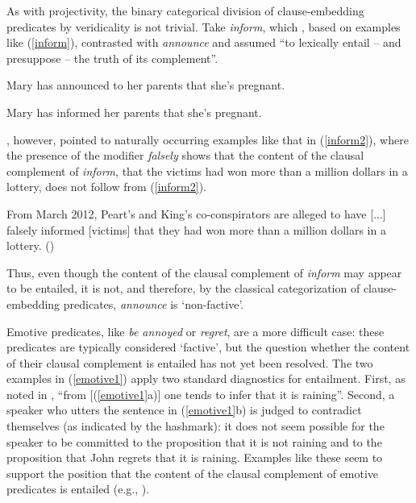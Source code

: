 \documentclass[11pt,fleqn]{article}
\newcommand{\6}{\mbox{$[\hspace*{-.6mm}[$}}
\newcommand{\9}{\mbox{$]\hspace*{-.6mm}]$}}
\begin{document}
As with projectivity, the binary categorical division of clause-embedding predicates by veridicality is not trivial. Take {\em inform}, which \citet[139]{schlenker10}, based on examples like (\ref{inform}), contrasted with {\em announce} and assumed ``to lexically entail -- and presuppose -- the truth of its complement''.

\begin{exe}
\ex\label{inform}

\begin{xlist}

\ex Mary has announced to her parents that she's pregnant.

\ex Mary has informed her parents that she's pregnant.

\end{xlist}
\end{exe}
\citet[76]{anand-hacquard2014}, however, pointed to naturally occurring examples like that in (\ref{inform2}), where the presence of the modifier {\em falsely} shows that the content of the clausal complement of {\em inform}, that the victims had won more than a million dollars in a lottery, does not follow from (\ref{inform2}).

\begin{exe}
\ex\label{inform2} From March 2012, Peart's and King's co-conspirators are alleged to have [...] falsely informed [victims] that they had won more than a million dollars in a lottery. \hfill (\citealt[76]{anand-hacquard2014})
\end{exe}
Thus, even though the content of the clausal complement of {\em inform} may appear to be entailed, it is not, and therefore, by the classical categorization of clause-embedding predicates, {\em announce} is `non-factive'.

Emotive predicates, like  {\em be annoyed} or {\em regret}, are a more difficult case: these predicates are typically considered `factive', but the question whether the content of their clausal complement is entailed has not yet been resolved. The two examples in (\ref{emotive1}) apply two standard diagnostics for entailment. First, as noted in \citealt[514]{abrusan2011}, ``from [(\ref{emotive1}a)] one tends to infer that it is raining''. Second, a speaker who utters the sentence in (\ref{emotive1}b) is judged to contradict themselves (as indicated by the hashmark): it does not seem possible for the speaker to be committed to the proposition that it is not raining and to the proposition that John regrets that it is raining. Examples like these seem to support the position that the content of the clausal complement of emotive predicates is entailed (e.g., \citealt{gazdar79a,abrusan2011,anand-hacquard2014}).
\end{document}
